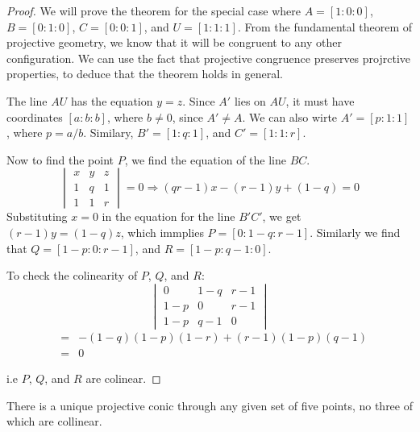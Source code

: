 \begin{proof}
  We will prove the theorem for the special case where $A=[1:0:0]$, $B=[0:1:0]$, $C=[0:0:1]$,
  and $U=[1:1:1]$. From the fundamental theorem of projective geometry, we know that it will be
  congruent to any other configuration. We can use the fact that projective congruence preserves
  projrctive properties, to deduce that the theorem holds in general.

  The line $AU$ has the equation $y=z$. Since $A'$ lies on $AU$, it must have coordinates
  $[a:b:b]$, where $b\ne 0$, since $A'\ne A$. We can also wirte $A'=[p:1:1]$, where $p=a/b$.
  Similary, $B'=[1:q:1]$, and $C'=[1:1:r]$.

  Now to find the point $P$, we find the equation of the line $BC$.
  \[
    \begin{vmatrix}
      x & y & z\\
      1 & q & 1\\
      1 & 1 & r
    \end{vmatrix}
    =0\Longrightarrow (qr-1)x-(r-1)y+(1-q)=0
  \]
  Substituting $x=0$ in the equation for the line $B'C'$, we get $(r-1)y=(1-q)z$, which immplies
  $P=[0:1-q:r-1]$. Similarly we find that $Q=[1-p:0:r-1]$, and $R=[1-p:q-1:0]$.

  To check the colinearity of $P$, $Q$, and $R$:
  \[
    \begin{vmatrix}
      0   & 1-q & r-1 \\
      1-p & 0   & r-1\\
      1-p & q-1 & 0
    \end{vmatrix}
  \]
  \begin{eqnarray*}
    &=& -(1-q)(1-p)(1-r)+(r-1)(1-p)(q-1)\\
    &=& 0
  \end{eqnarray*}

  i.e $P$, $Q$, and $R$ are colinear.
\end{proof}

\begin{prop}
  There is a unique projective conic through any given set of five points, no three of which are
  collinear.
\end{prop}

